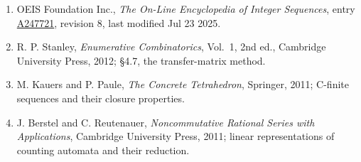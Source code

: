 \documentclass[11pt]{article}
\theoremstyle{definition}
\begin{document}
\begin{enumerate}

\item OEIS Foundation Inc., \emph{The On-Line Encyclopedia of Integer Sequences}, entry \href{https://oeis.org/A247721}{A247721}, revision 8, last modified Jul 23 2025.

\item R. P. Stanley, \emph{Enumerative Combinatorics}, Vol.~1, 2nd ed., Cambridge University Press, 2012; \S4.7, the transfer-matrix method.

\item M. Kauers and P. Paule, \emph{The Concrete Tetrahedron}, Springer, 2011; C-finite sequences and their closure properties.

\item J. Berstel and C. Reutenauer, \emph{Noncommutative Rational Series with Applications}, Cambridge University Press, 2011; linear representations of counting automata and their reduction.

\end{enumerate}
\end{document}
